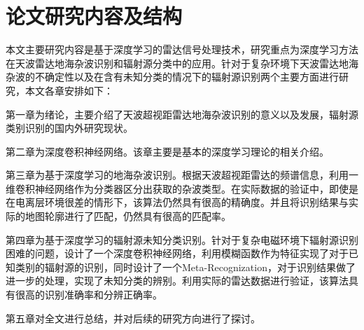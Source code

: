 \section{论文研究内容及结构}

本文主要研究内容是基于深度学习的雷达信号处理技术，研究重点为深度学习方法在天波雷达地海杂波识别和辐射源分类中的应用。针对于复杂环境下天波雷达地海杂波的不确定性以及在含有未知分类的情况下的辐射源识别两个主要方面进行研究，本文各章安排如下：

第一章为绪论，主要介绍了天波超视距雷达地海杂波识别的意义以及发展，辐射源类别识别的国内外研究现状。

第二章为深度卷积神经网络。该章主要是基本的深度学习理论的相关介绍。

第三章为基于深度学习的地海杂波识别。根据天波超视距雷达的频谱信息，利用一维卷积神经网络作为分类器区分出获取的杂波类型。在实际数据的验证中，即使是在电离层环境很差的情形下，该算法仍然具有很高的精确度。并且将识别结果与实际的地图轮廓进行了匹配，仍然具有很高的匹配率。

第四章为基于深度学习的辐射源未知分类识别。针对于复杂电磁环境下辐射源识别困难的问题，设计了一个深度卷积神经网络，利用模糊函数作为特征实现了对于已知类别的辐射源的识别，同时设计了一个Meta-Recognization，对于识别结果做了进一步的处理，实现了未知分类的辨别。利用实际的雷达数据进行验证，该算法具有很高的识别准确率和分辨正确率。

第五章对全文进行总结，并对后续的研究方向进行了探讨。